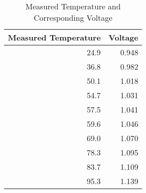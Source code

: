 \documentclass[11pt, a4paper]{article}
\begin{document}
\begin{table}[htbp]
  \centering
  \caption*{Measured Temperature and Corresponding Voltage}
  \label{tab:temp_voltage}
  \begin{tabular}{rr}
    \toprule
    \textbf{Measured Temperature} & \textbf{Voltage} \\
    \midrule
    24.9 & 0.948 \\
    36.8 & 0.982 \\
    50.1 & 1.018 \\
    54.7 & 1.031 \\
    57.5 & 1.041 \\
    59.6 & 1.046 \\
    69.0 & 1.070 \\
    78.3 & 1.095 \\
    83.7 & 1.109 \\
    95.3 & 1.139 \\
    \bottomrule
  \end{tabular}
\end{table}
\end{document}
